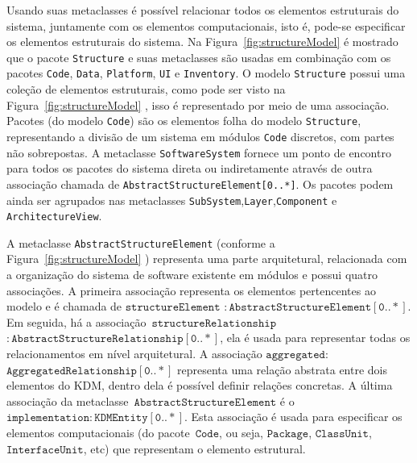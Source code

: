  Usando suas metaclasses é possível relacionar todos os elementos estruturais do sistema, juntamente com os elementos computacionais, isto é, pode-se especificar os elementos estruturais do sistema. Na Figura~\ref{fig:structureModel} é mostrado que o pacote \texttt{Structure} e suas metaclasses são usadas em combinação com os pacotes \texttt{Code}, \texttt{Data}, \texttt{Platform}, \texttt{UI} e \texttt{Inventory}. O modelo \texttt{Structure} possui uma coleção de elementos estruturais, como pode ser visto na Figura~\ref{fig:structureModel} , isso é representado por meio de uma associação. Pacotes (do modelo \texttt{Code}) são os elementos folha do modelo \texttt{Structure}, representando a divisão de um sistema em módulos \texttt{Code} discretos, com partes não sobrepostas. A metaclasse \texttt{SoftwareSystem} fornece um ponto de encontro para todos os pacotes do sistema direta ou indiretamente através de outra associação chamada de \texttt{AbstractStructureElement[0..*]}. Os pacotes podem ainda ser agrupados nas metaclasses \texttt{SubSystem},\texttt{Layer},\texttt{Component} e \texttt{ArchitectureView}. 
 
A metaclasse \texttt{AbstractStructureElement} (conforme a Figura~\ref{fig:structureModel} ) representa uma parte arquitetural, relacionada com a organização do sistema de software existente em módulos e possui quatro associações. A primeira associação representa os elementos pertencentes ao modelo e é chamada de $\mathtt{structureElement}$ $\mathtt{:AbstractStructureElement[0..*]}$. Em seguida, há a associação~$\mathtt{structureRelationship}$ $\mathtt{:AbstractStructureRelationship[0..*]}$, ela é usada para representar todas os relacionamentos em nível arquitetural. A associação $\mathtt{aggregated:}$ $\mathtt{AggregatedRelationship[0..*]}$ representa uma relação abstrata entre dois elementos do KDM, dentro dela é possível definir relações concretas. A última associação da metaclasse~$\mathtt{AbstractStructureElement}$ é o~$\mathtt{implementation:KDMEntity[0..*]}$. Esta associação é usada para especificar os elementos computacionais (do pacote~$\mathtt{Code}$, ou seja, $\mathtt{Package}$, $\mathtt{ClassUnit}$, $\mathtt{InterfaceUnit}$, etc) que representam o elemento estrutural. 

